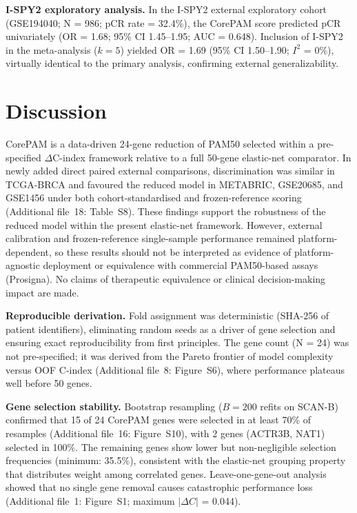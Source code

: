 \documentclass[pdflatex,sn-vancouver-num]{sn-jnl}
\begin{document}
\textbf{I-SPY2 exploratory analysis.} In the I-SPY2 external exploratory cohort (GSE194040; N = 986; pCR rate = 32.4\%), the CorePAM score predicted pCR univariately (OR = 1.68; 95\% CI 1.45--1.95; AUC = 0.648). Inclusion of I-SPY2 in the meta-analysis ($k = 5$) yielded OR = 1.69 (95\% CI 1.50--1.90; $I^2$ = 0\%), virtually identical to the primary analysis, confirming external generalizability.

\section{Discussion}\label{sec:discussion}

CorePAM is a data-driven 24-gene reduction of PAM50 selected within a pre-specified $\Delta$C-index framework relative to a full 50-gene elastic-net comparator. In newly added direct paired external comparisons, discrimination was similar in TCGA-BRCA and favoured the reduced model in METABRIC, GSE20685, and GSE1456 under both cohort-standardised and frozen-reference scoring (Additional file~18: Table~S8). These findings support the robustness of the reduced model within the present elastic-net framework. However, external calibration and frozen-reference single-sample performance remained platform-dependent, so these results should not be interpreted as evidence of platform-agnostic deployment or equivalence with commercial PAM50-based assays (Prosigna). No claims of therapeutic equivalence or clinical decision-making impact are made.

\textbf{Reproducible derivation.} Fold assignment was deterministic (SHA-256 of patient identifiers), eliminating random seeds as a driver of gene selection and ensuring exact reproducibility from first principles. The gene count (N = 24) was not pre-specified; it was derived from the Pareto frontier of model complexity versus OOF C-index (Additional file~8: Figure~S6), where performance plateaus well before 50 genes.

\textbf{Gene selection stability.} Bootstrap resampling ($B = 200$ refits on SCAN-B) confirmed that 15 of 24 CorePAM genes were selected in at least 70\% of resamples (Additional file~16: Figure~S10), with 2 genes (ACTR3B, NAT1) selected in 100\%. The remaining genes show lower but non-negligible selection frequencies (minimum: 35.5\%), consistent with the elastic-net grouping property that distributes weight among correlated genes. Leave-one-gene-out analysis showed that no single gene removal causes catastrophic performance loss (Additional file~1: Figure~S1; maximum $|\Delta C|$ = 0.044).
\end{document}
